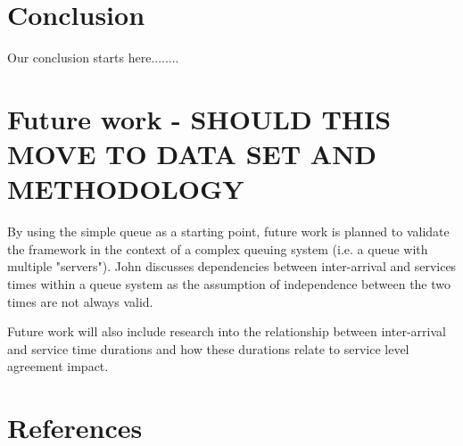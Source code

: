\documentclass[5p]{elsarticle}
\begin{document}
\section{Conclusion}

Our conclusion starts here........

\section{Future work - SHOULD THIS MOVE TO DATA SET AND METHODOLOGY}

By using the simple queue as a starting point, future work is planned to validate the framework in the context of a complex queuing system (i.e. a queue with multiple "servers"). John \cite{john1963single} discusses dependencies between inter-arrival and services times within a queue system as the assumption of independence between the two times are not always valid. \par Future work will also include research into the relationship between inter-arrival and service time durations and how these durations relate to service level agreement impact.



\section*{References}


\end{document}

